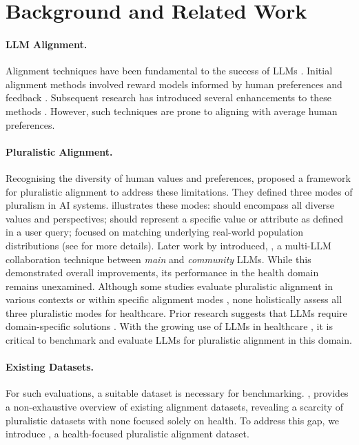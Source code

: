 
\section{Background and Related Work}
\paragraph{LLM Alignment.} Alignment techniques have been fundamental to the success of LLMs \citep{wang2023aligning}. Initial alignment methods involved reward models informed by human preferences and feedback \citep{schulman2017proximal,christiano2017deep,stiennon2020learning}. Subsequent research has introduced several enhancements to these methods \citep{ouyang2022training,rafailov2024direct,xia-etal-2024-aligning}. However, such techniques are prone to aligning with average human preferences. 

\paragraph{Pluralistic Alignment.} Recognising the diversity of human values and preferences, \citet{positionpluralistic} proposed a framework for pluralistic alignment to address these limitations. They defined three modes of pluralism in AI systems.  illustrates these modes: \overton should encompass all diverse values and perspectives; \steerable should represent a specific value or attribute as defined in a user query; \distributional focused on matching underlying real-world population distributions (see  for more details). Later work by \citet{feng2024modular} introduced, \modplural, a multi-LLM collaboration technique between \textit{main} and \textit{community} LLMs. While this demonstrated overall improvements, its performance in the health domain remains unexamined. Although some studies evaluate pluralistic alignment in various contexts \citep{liu-etal-2024-evaluating-moral,benkler2023assessing,huang2024flames} or within specific alignment modes \citep{lake2024from,meister2024benchmarking}, none holistically assess all three pluralistic modes for healthcare. Prior research suggests that LLMs require domain-specific solutions \citep{zhao2023survey}. With the growing use of LLMs in healthcare \citep{yang_large_nodate,thirunavukarasu2023large}, it is critical to benchmark and evaluate LLMs for pluralistic alignment in this domain.



\paragraph{Existing Datasets.} For such evaluations, a suitable dataset is necessary for benchmarking. , provides a non-exhaustive overview of existing alignment datasets, revealing a scarcity of pluralistic datasets with none focused solely on health. To address this gap, we introduce \ourdataset, a health-focused pluralistic alignment  dataset.

